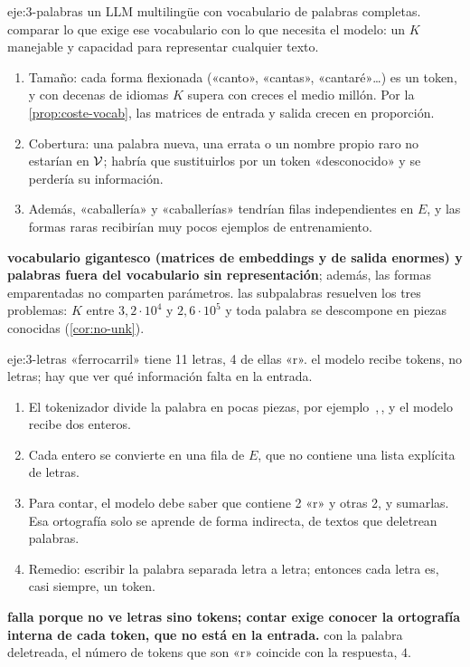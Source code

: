 \begin{solucion}{eje:3-palabras}
\datos un LLM multilingüe con vocabulario de palabras completas.
\planteamiento comparar lo que exige ese vocabulario con lo que necesita el modelo: un $K$ manejable y capacidad para representar cualquier texto.
\pasos
\begin{enumerate}[label=\arabic*.]
  \item Tamaño: cada forma flexionada («canto», «cantas», «cantaré»\dots) es un token, y con decenas de idiomas $K$ supera con creces el medio millón. Por la \cref{prop:coste-vocab}, las matrices de entrada y salida crecen en proporción.
  \item Cobertura: una palabra nueva, una errata o un nombre propio raro no estarían en $\mathcal{V}$; habría que sustituirlos por un token «desconocido» y se perdería su información.
  \item Además, «caballería» y «caballerías» tendrían filas independientes en $E$, y las formas raras recibirían muy pocos ejemplos de entrenamiento.
\end{enumerate}
\resultado \textbf{vocabulario gigantesco (matrices de embeddings y de salida enormes) y palabras fuera del vocabulario sin representación}; además, las formas emparentadas no comparten parámetros.
\comprobacion las subpalabras resuelven los tres problemas: $K$ entre $3{,}2\cdot 10^{4}$ y $2{,}6\cdot 10^{5}$ y toda palabra se descompone en piezas conocidas (\cref{cor:no-unk}).
\end{solucion}

\begin{solucion}{eje:3-letras}
\datos «ferrocarril» tiene 11 letras, 4 de ellas «r».
\planteamiento el modelo recibe tokens, no letras; hay que ver qué información falta en la entrada.
\pasos
\begin{enumerate}[label=\arabic*.]
  \item El tokenizador divide la palabra en pocas piezas, por ejemplo \,\sep{}\,, y el modelo recibe dos enteros.
  \item Cada entero se convierte en una fila de $E$, que no contiene una lista explícita de letras.
  \item Para contar, el modelo debe saber que  contiene 2 «r» y  otras 2, y sumarlas. Esa ortografía solo se aprende de forma indirecta, de textos que deletrean palabras.
  \item Remedio: escribir la palabra separada letra a letra; entonces cada letra es, casi siempre, un token.
\end{enumerate}
\resultado \textbf{falla porque no ve letras sino tokens; contar exige conocer la ortografía interna de cada token, que no está en la entrada.}
\comprobacion con la palabra deletreada, el número de tokens que son «r» coincide con la respuesta, $4$.
\end{solucion}

